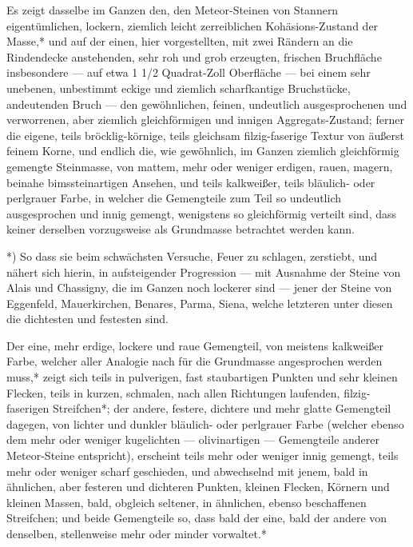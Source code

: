 \documentclass[a4paper, 11pt, oneside, german]{article}
\begin{document}
Es zeigt dasselbe im Ganzen den, den Meteor-Steinen von Stannern eigentümlichen, lockern, ziemlich leicht zerreiblichen Kohäsions-Zustand der Masse,* und auf der einen, hier vorgestellten, mit zwei Rändern an die Rindendecke anstehenden, sehr roh und grob erzeugten, frischen Bruchfläche insbesondere --- auf etwa 1 1/2 Quadrat-Zoll Oberfläche --- bei einem sehr unebenen, unbestimmt eckige und ziemlich scharfkantige Bruchstücke, andeutenden Bruch --- den gewöhnlichen, feinen, undeutlich ausgesprochenen und verworrenen, aber ziemlich gleichförmigen und innigen Aggregats-Zustand; ferner die eigene, teils bröcklig-körnige, teils gleichsam filzig-faserige Textur von äußerst feinem Korne, und endlich die, wie gewöhnlich, im Ganzen ziemlich gleichförmig gemengte Steinmasse, von mattem, mehr oder weniger erdigen, rauen, magern, beinahe bimssteinartigen Ansehen, und teils kalkweißer, teils bläulich- oder perlgrauer Farbe, in welcher die Gemengteile zum Teil so undeutlich ausgesprochen und innig gemengt, wenigstens so gleichförmig verteilt sind, dass keiner derselben vorzugsweise als Grundmasse betrachtet werden kann.

*) So dass sie beim schwächsten Versuche, Feuer zu schlagen, zerstiebt, und nähert sich hierin, in aufsteigender Progression --- mit Ausnahme der Steine von Alais und Chassigny, die im Ganzen noch lockerer sind --- jener der Steine von Eggenfeld, Mauerkirchen, Benares, Parma, Siena, welche letzteren unter diesen die dichtesten und festesten sind.

Der eine, mehr erdige, lockere und raue Gemengteil, von meistens kalkweißer Farbe, welcher aller Analogie nach für die Grundmasse angesprochen werden muss,* zeigt sich teils in pulverigen, fast staubartigen Punkten und sehr kleinen Flecken, teils in kurzen, schmalen, nach allen Richtungen laufenden, filzig-faserigen Streifchen*; der andere, festere, dichtere und mehr glatte Gemengteil dagegen, von lichter und dunkler bläulich- oder perlgrauer Farbe (welcher ebenso dem mehr oder weniger kugelichten --- olivinartigen --- Gemengteile anderer Meteor-Steine entspricht), erscheint teils mehr oder weniger innig gemengt, teils mehr oder weniger scharf geschieden, und abwechselnd mit jenem, bald in ähnlichen, aber festeren und dichteren Punkten, kleinen Flecken, Körnern und kleinen Massen, bald, obgleich seltener, in ähnlichen, ebenso beschaffenen Streifchen; und beide Gemengteile so, dass bald der eine, bald der andere von denselben, stellenweise mehr oder minder vorwaltet.*
\end{document}
